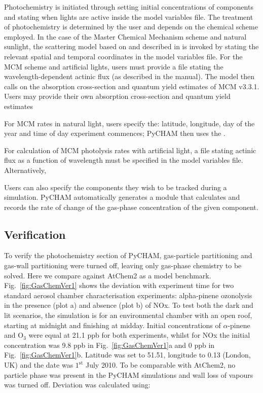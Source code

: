 \documentclass[gmd, manuscript]{copernicus}
\begin{document}
Photochemistry is initiated through setting initial concentrations of components and stating when lights are active inside the model variables file.  The treatment of photochemistry is determined by the user and depends on the chemical scheme employed.  In the case of the Master Chemical Mechanism scheme and natural sunlight, the scattering model based on \citet{Hayman1997} and described in \citet{Saunders2003} is invoked by stating the relevant spatial and temporal coordinates in the model variables file.  For the MCM scheme and artificial lights, users must provide a file stating the wavelength-dependent actinic flux (as described in the manual).  The model then calls on the absorption cross-section and quantum yield estimates of MCM v3.3.1.  Users may provide their own absorption cross-section and quantum yield estimates



For MCM rates in natural light, users specify the: latitude, longitude, day of the year and time of day experiment commences; PyCHAM then uses the .  

For calculation of MCM photolysis rates with artificial light, a file stating actinic flux as a function of wavelength must be specified in the model variables file.  Alternatively, 

Users can also specify the components they wish to be tracked during a simulation.  PyCHAM automatically generates a module that calculates and records the rate of change of the gas-phase concentration of the given component.


\subsection{Verification}
To verify the photochemistry section of PyCHAM, gas-particle partitioning and gas-wall partitioning were turned off, leaving only gas-phase chemistry to be solved.  Here we compare against AtChem2 \citep{sommariva_acm2018} as a model benchmark.  Fig.~\ref{fig:GasChemVer1} shows the deviation with experiment time for two standard aerosol chamber characterisation experiments: alpha-pinene ozonolysis in the presence (plot a) and absence (plot b) of NOx.  To test both the dark and lit scenarios, the simulation is for an environmental chamber with an open roof, starting at midnight and finishing at midday.  Initial concentrations of $\alpha$-pinene and O$_3$ were equal at 21.1 ppb for both experiments, whilst for NOx the initial concentration was 9.8 ppb in Fig.~\ref{fig:GasChemVer1}a and 0 ppb in Fig.~\ref{fig:GasChemVer1}b.  Latitude was set to 51.51, longitude to 0.13 (London, UK) and the date was $\mathrm{1^{st}}$ July 2010.  To be comparable with AtChem2, no particle phase was present in the PyCHAM simulations and wall loss of vapours was turned off.  Deviation was calculated using:
\end{document}
